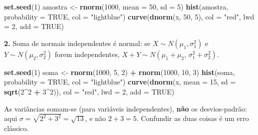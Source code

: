 \documentclass[
  portuguese,
  11pt,
  openany]{book}
\newenvironment{Shaded}{\begin{snugshade}}{\end{snugshade}}
\newcommand{\AttributeTok}[1]{\textcolor[rgb]{0.13,0.29,0.53}{#1}}
\newcommand{\ConstantTok}[1]{\textcolor[rgb]{0.56,0.35,0.01}{#1}}
\newcommand{\DecValTok}[1]{\textcolor[rgb]{0.00,0.00,0.81}{#1}}
\newcommand{\FunctionTok}[1]{\textcolor[rgb]{0.13,0.29,0.53}{\textbf{#1}}}
\newcommand{\NormalTok}[1]{#1}
\newcommand{\OtherTok}[1]{\textcolor[rgb]{0.56,0.35,0.01}{#1}}
\newcommand{\SpecialCharTok}[1]{\textcolor[rgb]{0.81,0.36,0.00}{\textbf{#1}}}
\newcommand{\StringTok}[1]{\textcolor[rgb]{0.31,0.60,0.02}{#1}}
\begin{document}
\begin{Shaded}
\begin{Highlighting}[]
\FunctionTok{set.seed}\NormalTok{(}\DecValTok{1}\NormalTok{)}
\NormalTok{amostra }\OtherTok{\textless{}{-}} \FunctionTok{rnorm}\NormalTok{(}\DecValTok{1000}\NormalTok{, }\AttributeTok{mean =} \DecValTok{50}\NormalTok{, }\AttributeTok{sd =} \DecValTok{5}\NormalTok{)}
\FunctionTok{hist}\NormalTok{(amostra, }\AttributeTok{probability =} \ConstantTok{TRUE}\NormalTok{, }\AttributeTok{col =} \StringTok{"lightblue"}\NormalTok{)}
\FunctionTok{curve}\NormalTok{(}\FunctionTok{dnorm}\NormalTok{(x, }\DecValTok{50}\NormalTok{, }\DecValTok{5}\NormalTok{), }\AttributeTok{col =} \StringTok{"red"}\NormalTok{, }\AttributeTok{lwd =} \DecValTok{2}\NormalTok{, }\AttributeTok{add =} \ConstantTok{TRUE}\NormalTok{)}
\end{Highlighting}
\end{Shaded}

\textbf{2.} Soma de normais independentes é normal: se \(X \sim N(\mu_1, \sigma_1^2)\) e
\(Y \sim N(\mu_2, \sigma_2^2)\) forem independentes, \(X + Y \sim N(\mu_1 + \mu_2,\,
\sigma_1^2 + \sigma_2^2)\).

\begin{Shaded}
\begin{Highlighting}[]
\FunctionTok{set.seed}\NormalTok{(}\DecValTok{1}\NormalTok{)}
\NormalTok{soma }\OtherTok{\textless{}{-}} \FunctionTok{rnorm}\NormalTok{(}\DecValTok{1000}\NormalTok{, }\DecValTok{5}\NormalTok{, }\DecValTok{2}\NormalTok{) }\SpecialCharTok{+} \FunctionTok{rnorm}\NormalTok{(}\DecValTok{1000}\NormalTok{, }\DecValTok{10}\NormalTok{, }\DecValTok{3}\NormalTok{)}
\FunctionTok{hist}\NormalTok{(soma, }\AttributeTok{probability =} \ConstantTok{TRUE}\NormalTok{, }\AttributeTok{col =} \StringTok{"lightblue"}\NormalTok{)}
\FunctionTok{curve}\NormalTok{(}\FunctionTok{dnorm}\NormalTok{(x, }\AttributeTok{mean =} \DecValTok{15}\NormalTok{, }\AttributeTok{sd =} \FunctionTok{sqrt}\NormalTok{(}\DecValTok{2}\SpecialCharTok{\^{}}\DecValTok{2} \SpecialCharTok{+} \DecValTok{3}\SpecialCharTok{\^{}}\DecValTok{2}\NormalTok{)), }\AttributeTok{col =} \StringTok{"red"}\NormalTok{, }\AttributeTok{lwd =} \DecValTok{2}\NormalTok{, }\AttributeTok{add =} \ConstantTok{TRUE}\NormalTok{)}
\end{Highlighting}
\end{Shaded}

As variâncias somam-se (para variáveis independentes), \textbf{não} os
desvios-padrão: aqui \(\sigma = \sqrt{2^2 + 3^2} = \sqrt{13}\), e não \(2 + 3 = 5\).
Confundir as duas coisas é um erro clássico.
\end{document}

